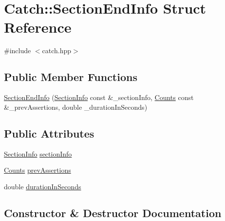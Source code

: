 \hypertarget{struct_catch_1_1_section_end_info}{}\section{Catch\+:\+:Section\+End\+Info Struct Reference}
\label{struct_catch_1_1_section_end_info}


{\ttfamily \#include $<$catch.\+hpp$>$}

\subsection*{Public Member Functions}
\begin{DoxyCompactItemize}
\item 
\mbox{\hyperlink{struct_catch_1_1_section_end_info_abc9381c7c22b6907317ec985ccaa6713}{Section\+End\+Info}} (\mbox{\hyperlink{struct_catch_1_1_section_info}{Section\+Info}} const \&\+\_\+section\+Info, \mbox{\hyperlink{struct_catch_1_1_counts}{Counts}} const \&\+\_\+prev\+Assertions, double \+\_\+duration\+In\+Seconds)
\end{DoxyCompactItemize}
\subsection*{Public Attributes}
\begin{DoxyCompactItemize}
\item 
\mbox{\hyperlink{struct_catch_1_1_section_info}{Section\+Info}} \mbox{\hyperlink{struct_catch_1_1_section_end_info_a2d44793392cb83735d086d726822abe9}{section\+Info}}
\item 
\mbox{\hyperlink{struct_catch_1_1_counts}{Counts}} \mbox{\hyperlink{struct_catch_1_1_section_end_info_ae70b154cbc05b5dd2901d97f89303d8c}{prev\+Assertions}}
\item 
double \mbox{\hyperlink{struct_catch_1_1_section_end_info_a7c262f2dab9cff166b8eca620c47eea5}{duration\+In\+Seconds}}
\end{DoxyCompactItemize}


\subsection{Constructor \& Destructor Documentation}
\mbox{\label{struct_catch_1_1_section_end_info_abc9381c7c22b6907317ec985ccaa6713}} 
